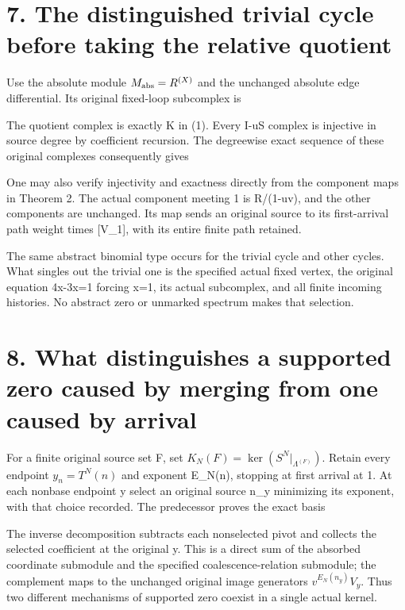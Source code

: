 \section{7. The distinguished trivial cycle before taking the relative
quotient}

Use the absolute module \(M_{\rm abs}=R^{(X)}\) and the unchanged
absolute edge differential. Its original fixed-loop subcomplex is


The quotient complex is exactly K in (1). Every I-uS complex is
injective in source degree by coefficient recursion. The degreewise
exact sequence of these original complexes consequently gives


One may also verify injectivity and exactness directly from the
component maps in Theorem 2. The actual component meeting 1 is R/(1-uv),
and the other components are unchanged. Its map sends an original source
to its first-arrival path weight times {[}V\_1{]}, with its entire
finite path retained.

The same abstract binomial type occurs for the trivial cycle and other
cycles. What singles out the trivial one is the specified actual fixed
vertex, the original equation 4x-3x=1 forcing x=1, its actual
subcomplex, and all finite incoming histories. No abstract zero or
unmarked spectrum makes that selection.

\section{8. What distinguishes a supported zero caused by merging from
one caused by arrival}

For a finite original source set F, set
\(K_N(F)=\ker(S^N|_{\Lambda^{(F)}})\). Retain every endpoint
\(y_n=T^N(n)\) and exponent E\_N(n), stopping at first arrival at 1. At
each nonbase endpoint y select an original source n\_y minimizing its
exponent, with that choice recorded. The predecessor proves the exact
basis


The inverse decomposition subtracts each nonselected pivot and collects
the selected coefficient at the original y. This is a direct sum of the
absorbed coordinate submodule and the specified coalescence-relation
submodule; the complement maps to the unchanged original image
generators \(v^{E_N(n_y)}V_y\). Thus two different mechanisms of
supported zero coexist in a single actual kernel.


